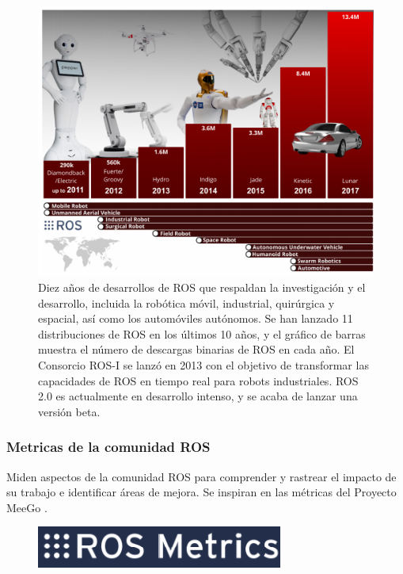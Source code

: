             \begin{figure}[htb]
                \centering
                \includegraphics[width=1.0\linewidth]{Main/Chapter3/Images3/science_robot_esta_2.png}
                \caption{Diez años de desarrollos de ROS que respaldan la investigación y el desarrollo, incluida la robótica móvil, industrial, quirúrgica y espacial, así como los automóviles autónomos. Se han lanzado 11 distribuciones de ROS en los últimos 10 años, y el gráfico de barras muestra el número de descargas binarias de ROS en cada año. El Consorcio ROS-I se lanzó en 2013 con el objetivo de transformar las capacidades de ROS en tiempo real para robots industriales. ROS 2.0 es actualmente en desarrollo intenso, y se acaba de lanzar una versión beta.}
                \label{f:Cap3-5_estadisticas_2}
            \end{figure}  


         \newpage
    
        \subsubsection{Metricas de la comunidad ROS}
    
    Miden aspectos de la comunidad ROS para comprender y rastrear el impacto de su trabajo e identificar áreas de mejora. Se inspiran en las métricas del Proyecto MeeGo .
    
        \begin{figure}[htb]
            \centering
            \includegraphics[width=0.4\linewidth]{Main/Chapter3/Images3/cap3_estadisticas_3.png}
            \caption{}
            \label{f:Cap3-5_estadisticas_3}
        \end{figure}  
        

